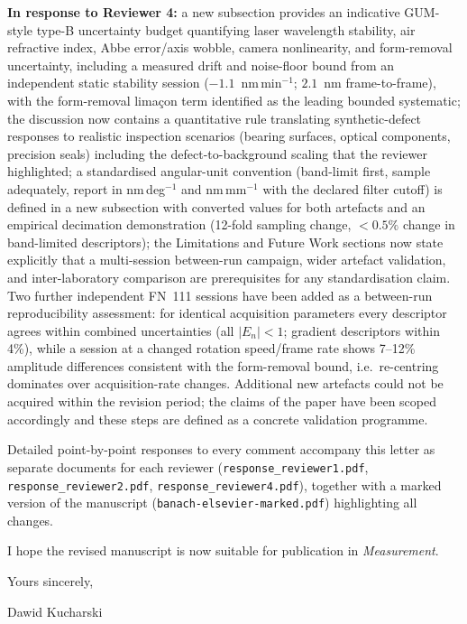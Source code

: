 \documentclass[11pt,a4paper]{article}
\begin{document}
\textbf{In response to Reviewer 4:} a new subsection provides an indicative GUM-style type-B uncertainty budget quantifying laser wavelength stability, air refractive index, Abbe error/axis wobble, camera nonlinearity, and form-removal uncertainty, including a measured drift and noise-floor bound from an independent static stability session ($-1.1$~nm\,min$^{-1}$; $2.1$~nm frame-to-frame), with the form-removal lima\c{c}on term identified as the leading bounded systematic; the discussion now contains a quantitative rule translating synthetic-defect responses to realistic inspection scenarios (bearing surfaces, optical components, precision seals) including the defect-to-background scaling that the reviewer highlighted; a standardised angular-unit convention (band-limit first, sample adequately, report in nm\,deg$^{-1}$ and nm\,mm$^{-1}$ with the declared filter cutoff) is defined in a new subsection with converted values for both artefacts and an empirical decimation demonstration (12-fold sampling change, $<0.5\%$ change in band-limited descriptors); the Limitations and Future Work sections now state explicitly that a multi-session between-run campaign, wider artefact validation, and inter-laboratory comparison are prerequisites for any standardisation claim. Two further independent FN~111 sessions have been added as a between-run reproducibility assessment: for identical acquisition parameters every descriptor agrees within combined uncertainties (all $|E_n|<1$; gradient descriptors within 4\%), while a session at a changed rotation speed/frame rate shows 7--12\% amplitude differences consistent with the form-removal bound, i.e.\ re-centring dominates over acquisition-rate changes. Additional new artefacts could not be acquired within the revision period; the claims of the paper have been scoped accordingly and these steps are defined as a concrete validation programme.

Detailed point-by-point responses to every comment accompany this letter as separate documents for each reviewer (\texttt{response\_reviewer1.pdf}, \texttt{response\_reviewer2.pdf}, \texttt{response\_reviewer4.pdf}), together with a marked version of the manuscript (\texttt{banach-elsevier-marked.pdf}) highlighting all changes.

I hope the revised manuscript is now suitable for publication in \textit{Measurement}.

\bigskip
Yours sincerely,

\bigskip
Dawid Kucharski
\end{document}
